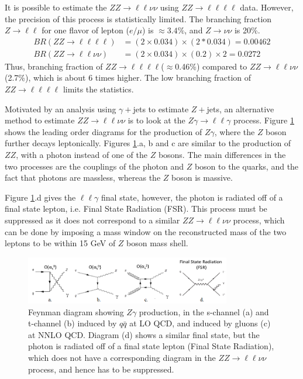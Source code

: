 \documentclass[11pt,a4paper,openright,twoside]{report}
\newcommand{\ZZ}{$ZZ\to \ell\ell\nu\nu$ }
\newcommand{\Zg}{$Z\gamma\to \ell\ell\gamma$ }
\begin{document}
It is possible to estimate the \ZZ using $ZZ\to \ell\ell\ell\ell$ data. However, the precision of this process is statistically limited. The branching fraction $Z\to\ell\ell$ for one flavor of lepton ($e/\mu$) is $\approx 3.4\%$, and $Z\to\nu\nu$ is 20\%. 
\begin{align}
BR(ZZ\to \ell\ell\ell\ell) &= (2\times 0.034)\times(2*0.034) = 0.00462\\
BR(ZZ\to \ell\ell\nu\nu) &= (2\times 0.034)\times(0.2)\times 2 = 0.0272
\end{align}
Thus, branching fraction of $ZZ\to \ell\ell\ell\ell$($\approx$0.46\%) compared to \ZZ (2.7\%), which is about 6 times higher. The low branching fraction of $ZZ\to \ell\ell\ell\ell$ limits the statistics.

Motivated by an analysis using $\gamma+$jets to estimate $Z+$jets\cite{gamma_jet}, an alternative method to estimate \ZZ is to look at the \Zg process. Figure \ref{fig:Zg} shows the leading order diagrams for the production of $Z\gamma$, where the $Z$ boson further decays leptonically. Figures \ref{fig:Zg}.a, b and c are similar to the production of $ZZ$, with a photon instead of one of the $Z$ bosons. The main differences in the two processes are the couplings of the photon and $Z$ boson to the quarks, and the fact that photons are massless, whereas the $Z$ boson is massive. 

Figure \ref{fig:Zg}.d gives the $\ell\ell\gamma$ final state, however, the photon is radiated off of a final state lepton, i.e. Final State Radiation (FSR). This process must be suppressed as it does not correspond to a similar \ZZ process, which can be done by imposing a mass window on the reconstructed mass of the two leptons to be within 15 GeV of $Z$ boson mass shell.

\begin{figure}[H]
\centering
		\includegraphics[width=0.8\textwidth]{Zg.png}
		\caption{Feynman diagram showing $Z\gamma$ production, in the s-channel (a) and t-channel (b) induced by $q\bar{q}$ at LO QCD, and induced by gluons (c) at NNLO QCD. Diagram (d) shows a similar final state, but the photon is radiated off of a final state lepton (Final State Radiation), which does not have a corresponding diagram in the \ZZ process, and hence has to be suppressed.}
		\label{fig:Zg}
\end{figure}
\end{document}
